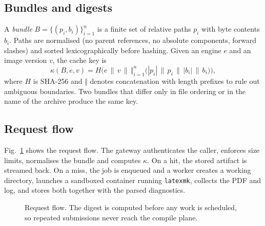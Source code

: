 \documentclass[journal]{IEEEtran}
\begin{document}
\subsection{Bundles and digests}
A \emph{bundle} $B = \{(p_i, b_i)\}_{i=1}^{n}$ is a finite set of relative
paths $p_i$ with byte contents $b_i$. Paths are normalised (no parent
references, no absolute components, forward slashes) and sorted
lexicographically before hashing. Given an engine $e$ and an image version
$v$, the cache key is
\begin{equation}
  \kappa(B, e, v) = H\Big( e \,\|\, v \,\|\, \big\Vert_{i=1}^{n}
    \big(|p_i| \,\|\, p_i \,\|\, |b_i| \,\|\, b_i\big) \Big),
  \label{eq:key}
\end{equation}
where $H$ is SHA-256 and $\Vert$ denotes concatenation with length prefixes
to rule out ambiguous boundaries. Two bundles that differ only in file
ordering or in the name of the archive produce the same key.

\subsection{Request flow}
Fig.~\ref{fig:flow} shows the request flow. The gateway authenticates the
caller, enforces size limits, normalises the bundle and computes $\kappa$. On
a hit, the stored artifact is streamed back. On a miss, the job is enqueued
and a worker creates a working directory, launches a sandboxed container
running \texttt{latexmk}, collects the PDF and log, and stores both together
with the parsed diagnostics.

\begin{figure}[!t]
  \centering
  \caption{Request flow. The digest is computed before any work is scheduled,
    so repeated submissions never reach the compile plane.}
  \label{fig:flow}
\end{figure}
\end{document}
